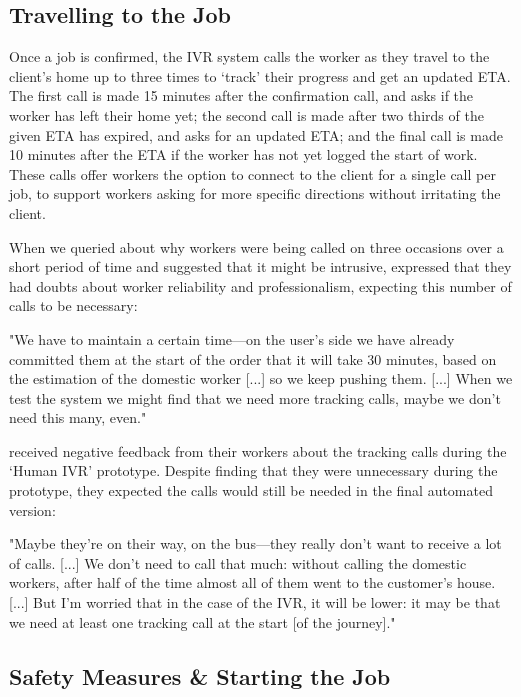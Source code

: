 \subsection{Travelling to the Job}
Once a job is confirmed, the IVR system calls the worker as they travel to the client's home up to three times to `track’ their progress and get an updated ETA. The first call is made 15 minutes after the confirmation call, and asks if the worker has left their home yet; the second call is made after two thirds of the given ETA has expired, and asks for an updated ETA; and the final call is made 10 minutes after the ETA if the worker has not yet logged the start of work. These calls offer workers the option to connect to the client for a single call per job, to support workers asking for more specific directions without irritating the client. 

When we queried about why workers were being called on three occasions over a short period of time and suggested that it might be intrusive, \PC{} expressed that they had doubts about worker reliability and professionalism, expecting this number of calls to be necessary:

\begin{displayquote}
"We have to maintain a certain time---on the user’s side we have already committed them at the start of the order that it will take 30 minutes, based on the estimation of the domestic worker [...] so we keep pushing them. [...] When we test the system we might find that we need more tracking calls, maybe we don’t need this many, even."
\end{displayquote}

\PC{} received negative feedback from their workers about the tracking calls during the `Human IVR' prototype. Despite finding that they were unnecessary during the prototype, they expected the calls would still be needed in the final automated version:

\begin{displayquote}
"Maybe they’re on their way, on the bus---they really don’t want to receive a lot of calls. [...] We don’t need to call that much: without calling the domestic workers, after half of the time almost all of them went to the customer’s house. [...] But I’m worried that in the case of the IVR, it will be lower: it may be that we need at least one tracking call at the start [of the journey]."
\end{displayquote}

\subsection{Safety Measures \& Starting the Job}

